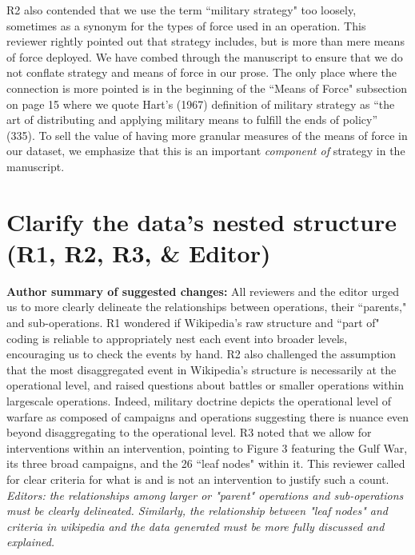 \documentclass[fleqn,12pt]{article}
\begin{document}
R2 also contended that we use the term ``military strategy" too loosely, sometimes as a synonym for the types of force used in an operation. This reviewer rightly pointed out that strategy includes, but is more than mere means of force deployed. We have combed through the manuscript to ensure that we do not conflate strategy and means of force in our prose. The only place where the connection is more pointed is in the beginning of the ``Means of Force" subsection on page 15 where we quote Hart's (1967) definition of military strategy as ``the art of distributing and applying military means to fulfill the ends of policy” (335). To sell the value of having more granular measures of the means of force in our dataset, we emphasize that this is an important \textit{component of} strategy in the manuscript.

\section{Clarify the data's nested structure (R1, R2, R3, \& Editor)}

\noindent \textbf{Author summary of suggested changes:} All reviewers and the editor urged us to more clearly delineate the relationships between operations, their ``parents," and sub-operations. R1 wondered if Wikipedia's raw structure and ``part of" coding is reliable to appropriately nest each event into broader levels, encouraging us to check the events by hand. R2 also challenged the assumption that the most disaggregated event in Wikipedia's structure is necessarily at the operational level, and raised questions about battles or smaller operations within largescale operations. Indeed, military doctrine depicts the operational level of warfare as composed of campaigns and operations suggesting there is nuance even beyond disaggregating to the operational level. R3 noted that we allow for interventions within an intervention, pointing to Figure 3 featuring the Gulf War, its three broad campaigns, and the 26 ``leaf nodes" within it. This reviewer called for clear criteria for what is and is not an intervention to justify such a count. \\

\noindent
\textit{Editors: the relationships among larger or "parent" operations and sub-operations must be clearly delineated.  Similarly, the relationship between "leaf nodes" and criteria in wikipedia and the data generated must be more fully discussed and explained.} \\
\end{document}
